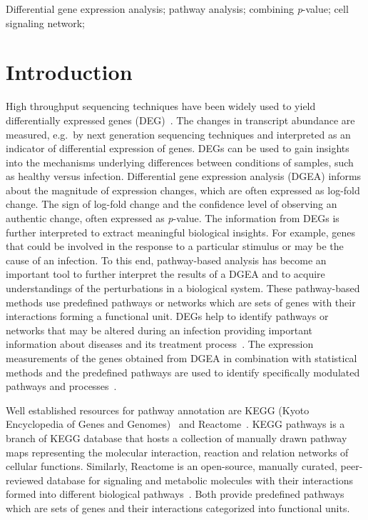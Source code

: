 \documentclass[10pt,a4paper,twocolumn]{article}
\begin{document}
Differential gene expression analysis; pathway analysis; combining \textit{p}-value; cell signaling network;

\clearpage

\section*{Introduction}

High throughput sequencing techniques have been widely used to yield
differentially expressed genes (DEG)~\cite{DEG}. The changes in
transcript abundance are measured, e.g.~by next generation sequencing
techniques and interpreted as an indicator of differential expression of
genes. DEGs can be used to gain insights into the mechanisms underlying differences between conditions of samples, such as healthy versus infection. Differential gene expression analysis (DGEA) informs about the
magnitude of expression changes, which are often
expressed as log-fold change. The sign of log-fold change and the confidence level of
observing an authentic change, often expressed as \textit{p}-value. The information from DEGs is further interpreted to extract meaningful biological
insights. For example, genes that could be involved in the response to a
particular stimulus or may be the cause of an infection. To this end, pathway-based analysis has become an important tool to further interpret
the results of a DGEA and to acquire understandings of the perturbations in
a biological system. These pathway-based methods use predefined pathways or
networks which are sets of genes with their
interactions forming a functional unit. DEGs help to identify pathways or
networks that may be altered during an infection providing
important information about diseases and its treatment
process~\cite{Khatri2012}. The
expression measurements of the genes obtained from DGEA in combination with
statistical methods and the predefined pathways are used to identify specifically modulated
pathways and processes~\cite{Campos}. 


Well established resources for pathway annotation are KEGG (Kyoto
Encyclopedia of Genes and Genomes)~\cite{Kegg} and Reactome~\cite{Reactome}. KEGG pathways is a branch of KEGG database that
hosts a collection of manually drawn pathway maps representing the
molecular interaction, reaction and relation networks of cellular
functions. Similarly, Reactome is an open-source, manually curated,
peer-reviewed database for signaling and metabolic molecules with their
interactions formed into different biological pathways~\cite{Reactome}. Both provide predefined pathways which are sets of
genes and their interactions categorized into functional units.
\end{document}
